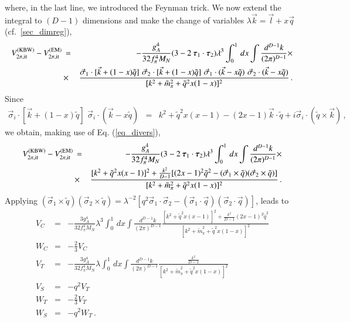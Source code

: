 \documentclass[sort&compress,preprint,3p]{elsarticle}
\newcommand{\bbox}[1]{\mbox{\boldmath $#1$}}
\begin{document}
where, in the last line, we introduced the Feynman trick.
We now extend the integral to $(D-1)$ dimensions and make the change of variables
$\lambda \vec k= \vec l + x\vec q$ (cf.\ \ref{sec_dimreg}),
\begin{eqnarray}
V_{2\pi, \rm it}^{\rm(KBW)} - V_{2\pi, \rm it}^{\rm(EM)}\, &=&
- \frac{g_A^4}{32 f_\pi^4 M_N}
(3-2 \: \bbox{\tau}_1 \cdot \bbox{\tau}_2) \lambda^3
\int _0^1\,dx \int \frac{d^{D-1} k}{(2 \pi)^{D-1}}
\times
\nonumber \\ & \times &
\frac{\vec \sigma_1 \cdot [\vec k + (1-x)\tilde q] \,\, 
\vec \sigma_2 \cdot [\vec k + (1-x)\tilde q] \,\,
\vec \sigma_1 \cdot (\vec k-x\tilde q) \,\, \vec \sigma_2 \cdot (\vec k-x\tilde q)}
{[k^2 + \tilde m_\pi^2+\tilde q^2 x(1-x)]^2} \,.
\end{eqnarray}
Since
\begin{eqnarray}
\vec \sigma_i \cdot [\vec k + (1-x)\tilde q] \,\, \vec \sigma_i \cdot (\vec k-x\tilde q) 
&=& k^2+\tilde q^2x(x-1) -(2x-1)\vec k\cdot \tilde q
+i\vec \sigma_i \cdot (\tilde q\times\vec k) \,,
\end{eqnarray}
 we obtain, making use of Eq. (\ref{eq_divers}),
\begin{eqnarray}
V_{2\pi, \rm it}^{\rm(KBW)} - V_{2\pi, \rm it}^{\rm(EM)}\, &=&
- \frac{g_A^4}{32 f_\pi^4 M_N}
(3-2 \: \bbox{\tau}_1 \cdot \bbox{\tau}_2) \lambda^3
\int _0^1\,dx \int \frac{d^{D-1} k}{(2 \pi)^{D-1}}  \times
\nonumber \\ & \times &
\frac{[k^2+\tilde q^2x(x-1)]^2 +\frac{k^2}{D-1}[(2x-1)^2\tilde q^2-(\vec \sigma_1 \times \tilde q)(\vec \sigma_2 \times \tilde q)]
}
{[k^2 + \tilde m_\pi^2+\tilde q^2 x(1-x)]^2}  \,.
\end{eqnarray}
Applying $(\vec \sigma_1 \times \tilde q)(\vec \sigma_2 \times \tilde q)=
\lambda^{-2}[q^2 \vec \sigma_1\cdot\vec \sigma_2-(\vec \sigma_1\cdot\vec q)(\vec \sigma_2\cdot\vec q)]$, leads to
\begin{eqnarray}
V_C &=&
- \frac{3g_A^4}{32 f_\pi^4 M_N}
\lambda^3
\int _0^1\,dx \int \frac{d^{D-1} k}{(2 \pi)^{D-1}}
\frac{[k^2+\tilde q^2x(x-1)]^2 +\frac{k^2}{D-1}(2x-1)^2\tilde q^2
}
{[k^2 + \tilde m_\pi^2+\tilde q^2 x(1-x)]^2}
\\ 
W_C &=& -\frac 2 3 V_C
\\ 
V_T &=& - \frac{3g_A^4}{32 f_\pi^4 M_N}
\lambda
\int _0^1\,dx \int \frac{d^{D-1} k}{(2 \pi)^{D-1}}
\frac{\frac{k^2}{D-1}
}
{[k^2 + \tilde m_\pi^2+\tilde q^2 x(1-x)]^2}
\\ 
V_S &=& -q^2 V_T
\\ 
W_T &=& -\frac 2 3V_T
\\ 
W_S &=& -q^2 W_T
\,.
\end{eqnarray}
\end{document}
